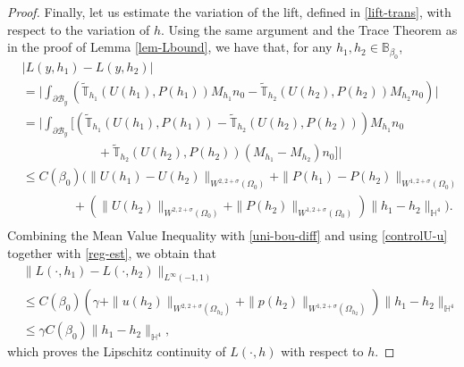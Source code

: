 \documentclass[10pt,a4paper]{amsart}
\begin{document}
\begin{proof}
Finally, let us estimate the variation of the lift, defined in \eqref{lift-trans}, with respect to the variation of $h$. Using the same argument and the Trace Theorem as in the proof of Lemma \ref{lem-Lbound}, we have that,  for any $h_1,h_2\in \mathbb{B}_{\beta_0}$,
\begin{equation}\label{diff-lift}\begin{aligned}
&|	L(y, h_1) - 	L(y, h_2) |\\[5pt]&=
\bigg|\int_{\partial \mathcal{B}_y}  \left(\widetilde{\mathbb{T}}_{h_1}(U(h_1), P(h_1)) M_{h_1}n_0 - \widetilde{\mathbb{T}}_{h_2}(U(h_2), P(h_2)) M_{h_2}n_0\right) \bigg|
\\[5pt]&
=\bigg| \int_{\partial \mathcal{B}_y}\bigg[\left(\widetilde{\mathbb{T}}_{h_1}(U(h_1),P(h_1)) - \widetilde{\mathbb{T}}_{h_2}(U(h_2),P(h_2)) \right) M_{h_1}n_0 \\[2pt]&\qquad \qquad\qquad  +\widetilde{\mathbb{T}}_{h_2}(U(h_2),P(h_2)) (M_{h_1} - M_{h_2})n_0\bigg]\bigg|\\[5pt]&
\leq C(\beta_0)\bigg(\|U(h_1)- U(h_2)\|_{W^{2, 2+\sigma}(\Omega_0)}+ \|P(h_1)-P(h_2)\|_{W^{1, 2+\sigma}(\Omega_0)} \\[2pt]&\qquad\qquad  +\left(\|U(h_2)\|_{W^{2,2+\sigma}(\Omega_0)}+ \|P(h_2)\|_{W^{1, 2+\sigma}(\Omega_0)}\right)\|h_1-h_2\|_{\mathbb{H}^4}\bigg).\\[5pt]
\end{aligned}
\end{equation}
 Combining the Mean Value Inequality with \eqref{uni-bou-diff} and using \eqref{controlU-u} together with \eqref{reg-est}, we obtain that
\begin{equation*}\begin{aligned} &\|	L(\cdot, h_1) - 	L(\cdot, h_2) \|_{L^\infty(-1,1)}\\[5pt]&\leq C(\beta_0)\left(\gamma + \|u(h_2)\|_{W^{2, 2+\sigma}(\Omega_{h_2})}+ \|p(h_2)\|_{W^{1, 2+\sigma}(\Omega_{h_2})}\right)\|h_1-h_2\|_{\mathbb{H}^4}\\[5pt]&\leq \gamma C(\beta_0)\|h_1-h_2\|_{\mathbb{H}^4},
\end{aligned}
\end{equation*} which proves the Lipschitz continuity of $L(\cdot, h)$ with respect to $h$.
\end{proof}
\end{document}
